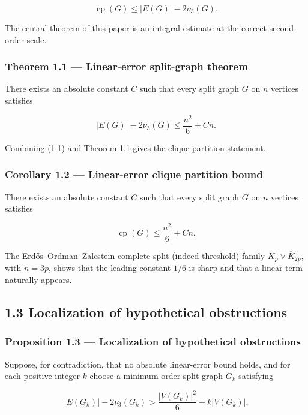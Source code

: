 \documentclass[11pt,a4paper]{article}
\begin{document}
\[
\operatorname{cp}(G)
\le
|E(G)|-2\nu_3(G).
\tag{1.1}
\]

The central theorem of this paper is an integral estimate at the correct second-order scale.

\subsubsection{Theorem 1.1 --- Linear-error split-graph theorem}\label{theorem-1.1-linear-error-split-graph-theorem}

There exists an absolute constant \(C\) such that every split graph \(G\) on \(n\) vertices satisfies

\[
\boxed{
|E(G)|-2\nu_3(G)
\le
\frac{n^2}{6}+Cn.
}
\tag{1.2}
\]

Combining (1.1) and Theorem 1.1 gives the clique-partition statement.

\subsubsection{Corollary 1.2 --- Linear-error clique partition bound}\label{corollary-1.2-linear-error-clique-partition-bound}

There exists an absolute constant \(C\) such that every split graph \(G\) on \(n\) vertices satisfies

\[
\boxed{
\operatorname{cp}(G)
\le
\frac{n^2}{6}+Cn.
}
\tag{1.3}
\]

The Erdős--Ordman--Zalcstein complete-split (indeed threshold) family \(K_p\vee\overline K_{2p}\), with \(n=3p\), shows that the leading constant \(1/6\) is sharp and that a linear term naturally appears.

\subsection{1.3 Localization of hypothetical obstructions}\label{localization-of-hypothetical-obstructions}

\subsubsection{Proposition 1.3 --- Localization of hypothetical obstructions}\label{proposition-1.3-localization-of-hypothetical-obstructions}

Suppose, for contradiction, that no absolute linear-error bound holds, and for each positive integer \(k\) choose a minimum-order split graph \(G_k\) satisfying

\[
|E(G_k)|-2\nu_3(G_k)>\frac{|V(G_k)|^2}{6}+k|V(G_k)|.
\]
\end{document}
